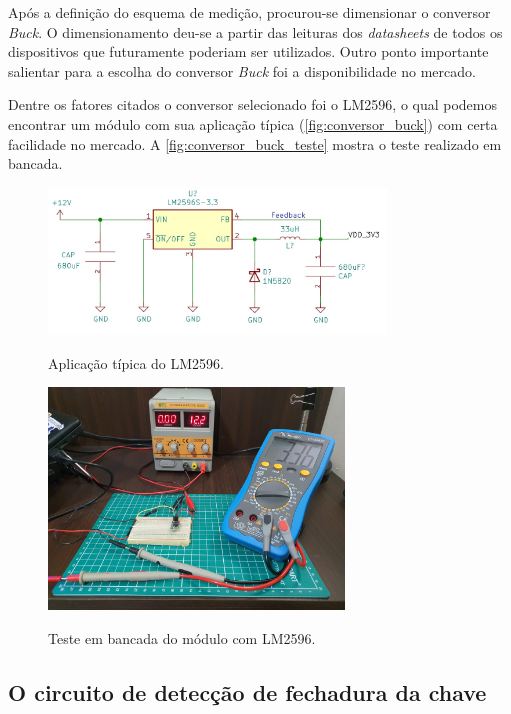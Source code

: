 Após a definição do esquema de medição, procurou-se dimensionar o conversor \textit{Buck}. O dimensionamento deu-se a partir das leituras dos \textit{datasheets} de todos os dispositivos que futuramente poderiam ser utilizados. Outro ponto importante salientar para a escolha do conversor \textit{Buck} foi a disponibilidade no mercado.

Dentre os fatores citados o conversor selecionado foi o LM2596, o qual podemos encontrar um módulo com sua aplicação típica (\autoref{fig:conversor_buck}) com certa facilidade no mercado. A \autoref{fig:conversor_buck_teste} mostra o teste realizado em bancada.

\begin{figure}[H]
	\centering
	\caption{Aplicação típica do LM2596.}
	\includegraphics[width=0.8\textwidth]{figuras/conversor_buck.jpg}
	\label{fig:conversor_buck}
\end{figure}

\begin{figure}[H]
	\centering
	\caption{Teste em bancada do módulo com LM2596.}
	\includegraphics[width=0.7\textwidth]{figuras/conversor_buck_teste.jpg}
	\label{fig:conversor_buck_teste}
\end{figure}

\subsection{O circuito de detecção de fechadura da chave}
